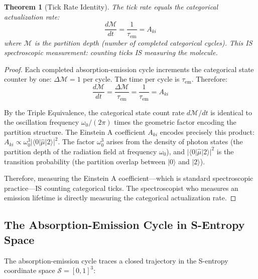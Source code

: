 \documentclass[11pt,twocolumn,a4paper]{article}
\newtheorem{theorem}{Theorem}[section]
\theoremstyle{definition}
\theoremstyle{remark}
\newcommand{\Sspace}{\mathcal{S}}
\newcommand{\Depth}{\mathcal{M}}
\newcommand{\tem}{\tau_{\mathrm{em}}}
\newcommand{\Aki}{A_{ki}}
\begin{document}
\begin{theorem}[Tick Rate Identity]
\label{thm:tick_rate}
The tick rate equals the categorical actualization rate:
\begin{equation}
\frac{d\Depth}{dt} = \frac{1}{\tem} = \Aki
\label{eq:tick_rate}
\end{equation}
where $\Depth$ is the partition depth (number of completed categorical cycles). This IS spectroscopic measurement: counting ticks IS measuring the molecule.
\end{theorem}

\begin{proof}
Each completed absorption-emission cycle increments the categorical state counter by one: $\Delta\Depth = 1$ per cycle. The time per cycle is $\tem$. Therefore:
\begin{equation}
\frac{d\Depth}{dt} = \frac{\Delta\Depth}{\tem} = \frac{1}{\tem} = \Aki
\end{equation}

By the Triple Equivalence, the categorical state count rate $d\Depth/dt$ is identical to the oscillation frequency $\omega_0/(2\pi)$ times the geometric factor encoding the partition structure. The Einstein A coefficient $\Aki$ encodes precisely this product: $\Aki \propto \omega_0^3 |\langle 0|\hat{\mu}|2\rangle|^2$. The factor $\omega_0^3$ arises from the density of photon states (the partition depth of the radiation field at frequency $\omega_0$), and $|\langle 0|\hat{\mu}|2\rangle|^2$ is the transition probability (the partition overlap between $|0\rangle$ and $|2\rangle$).

Therefore, measuring the Einstein A coefficient---which is standard spectroscopic practice---IS counting categorical ticks. The spectroscopist who measures an emission lifetime is directly measuring the categorical actualization rate.
\end{proof}

\subsection{The Absorption-Emission Cycle in S-Entropy Space}

The absorption-emission cycle traces a closed trajectory in the S-entropy coordinate space $\Sspace = [0,1]^3$:
\end{document}
